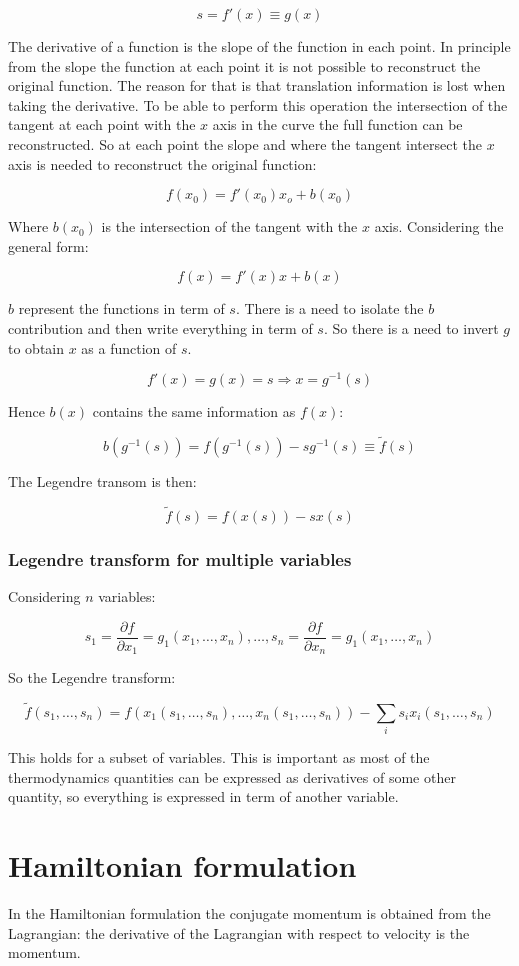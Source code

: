 	$$s = f'(x) \equiv g(x)$$

	The derivative of a function is the slope of the function in each point.
	In principle from the slope the function at each point it is not possible to reconstruct the original function.
	The reason for that is that translation information is lost when taking the derivative.
	To be able to perform this operation the intersection of the tangent at each point with the $x$ axis in the curve the full function can be reconstructed.
	So at each point the slope and where the tangent intersect the $x$ axis is needed to reconstruct the original function:

	$$f(x_0) = f'(x_0)x_o + b(x_0)$$

	Where $b(x_0)$ is the intersection of the tangent with the $x$ axis.
	Considering the general form:

	$$f(x) = f'(x)x+b(x)$$

	$b$ represent the functions in term of $s$.
	There is a need to isolate the $b$ contribution and then write everything in term of $s$.
	So there is a need to invert $g$ to obtain $x$ as a function of $s$.

	$$f'(x) = g(x) = s \Rightarrow x = g^{-1}(s)$$

	Hence $b(x)$ contains the same information as $f(x)$:

	$$b(g^{-1}(s)) = f(g^{-1}(s))-sg^{-1}(s) \equiv\tilde{f}(s)$$

	The Legendre transom is then:

	$$\tilde{f}(s) = f(x(s))-sx(s)$$

		\subsubsection{Legendre transform for multiple variables}
		Considering $n$ variables:

		$$s_1 = \frac{\partial f}{\partial x_1} = g_1(x_1, \dots, x_n), \dots, s_n = \frac{\partial f}{\partial x_n} = g_1(x_1, \dots, x_n)$$

		So the Legendre transform:

		$$\tilde{f}(s_1, \dots, s_n) = f(x_1(s_1, \dots, s_n), \dots, x_n(s_1, \dots, s_n))-\sum\limits_i s_ix_i(s_1, \dots, s_n)$$

		This holds for a subset of variables.
		This is important as most of the thermodynamics quantities can be expressed as derivatives of some other quantity, so everything is expressed in term of another variable.

\section{Hamiltonian formulation}
In the Hamiltonian formulation the conjugate momentum is obtained from the Lagrangian: the derivative of the Lagrangian with respect to velocity is the momentum.

